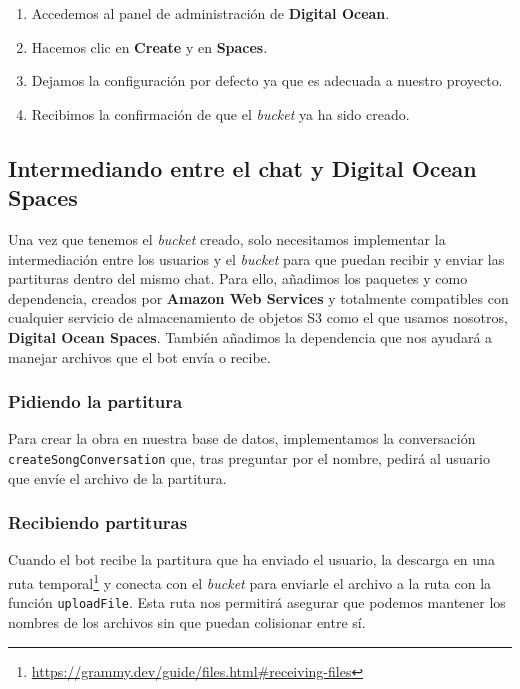 \begin{enumerate}
    \item Accedemos al panel de administración de \textbf{Digital Ocean}.
    \item Hacemos clic en \textbf{Create} y en \textbf{Spaces}.
    \item Dejamos la configuración por defecto ya que es adecuada a nuestro proyecto.
    \item Recibimos la confirmación de que el \textit{bucket} ya ha sido creado.
\end{enumerate}

\subsection{Intermediando entre el chat y Digital Ocean Spaces}

Una vez que tenemos el \textit{bucket} creado, solo necesitamos implementar la intermediación entre los usuarios y el \textit{bucket} para que puedan recibir y enviar las partituras dentro del mismo chat. Para ello, añadimos los paquetes  y  como dependencia, creados por \textbf{Amazon Web Services} y totalmente compatibles con cualquier servicio de almacenamiento de objetos S3 como el que usamos nosotros, \textbf{Digital Ocean Spaces}. También añadimos la dependencia  que nos ayudará a manejar archivos que el bot envía o recibe.

\subsubsection{Pidiendo la partitura}

Para crear la obra en nuestra base de datos, implementamos la conversación \texttt{createSongConversation} que, tras preguntar por el nombre, pedirá al usuario que envíe el archivo de la partitura.

\subsubsection{Recibiendo partituras}

Cuando el bot recibe la partitura que ha enviado el usuario, la descarga en una ruta temporal\footnote{\url{https://grammy.dev/guide/files.html\#receiving-files}} y conecta con el \textit{bucket} para enviarle el archivo a la ruta  con la función \texttt{uploadFile}. Esta ruta nos permitirá asegurar que podemos mantener los nombres de los archivos sin que puedan colisionar entre sí.

